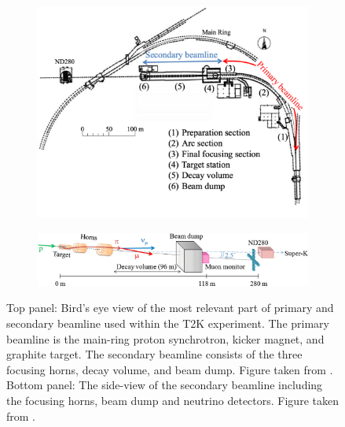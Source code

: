 \begin{figure}[h]
  \begin{subfigure}[t]{0.7\textwidth}
    \includegraphics[width=\textwidth, trim={0mm 0mm 0mm 0mm}, clip,page=1]{Figures/Detectors/T2KBeamline.pdf}
  \end{subfigure}
  \begin{subfigure}[t]{0.95\textwidth}
    \vspace{0.5cm}
    \includegraphics[width=\textwidth, trim={0mm 0mm 0mm 0mm}, clip,page=1]{Figures/Detectors/T2KSecondaryBeamline.pdf}
  \end{subfigure}
  \caption{Top panel: Bird's eye view of the most relevant part of primary and secondary beamline used within the T2K experiment. The primary beamline is the main-ring proton synchrotron, kicker magnet, and graphite target. The secondary beamline consists of the three focusing horns, decay volume, and beam dump. Figure taken from \cite{t2k_det}. Bottom panel: The side-view of the secondary beamline including the focusing horns, beam dump and neutrino detectors. Figure taken from \cite{MuMon}.}
  \label{fig:T2KSKExp_T2K_Beamline}
\end{figure}


